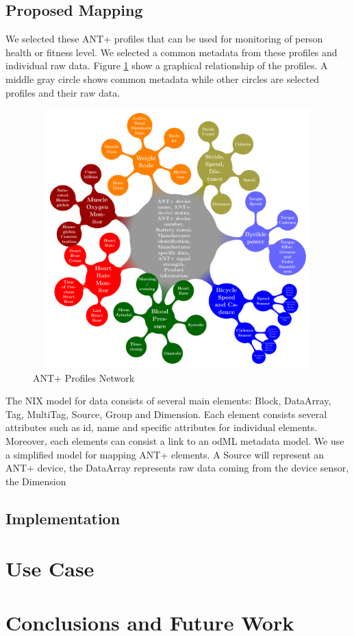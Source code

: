\documentclass[conference]{IEEEconf}
\begin{document}
\subsection{Proposed Mapping}

We selected these ANT+ profiles that can be used for monitoring of person health or fitness level. We selected a common metadata from these profiles and individual raw data. Figure \ref{AntPlus} show a graphical relationship of the profiles. A middle gray circle shows common metadata while other circles are selected profiles and their raw data. 

\begin{figure}
\centering\includegraphics[width=12cm, height=10cm]{AntPlusProfiles}
\caption{\label{AntPlus}ANT+ Profiles Network}
\end{figure}

The NIX model for data consists of several main elements: Block, DataArray, Tag, MultiTag, Source, Group and Dimension. Each element consists several attributes such as id, name and specific attributes for individual elements. Moreover, each elements can consist a link to an odML metadata model. We use a simplified model for mapping ANT+ elements. A Source will represent an ANT+ device, the DataArray represents raw data coming from the device sensor, the Dimension 

\subsection{Implementation}

\section{Use Case}\label{sec:use-case}

\section{Conclusions and Future Work}\label{sec:future-work}








\end{document}
